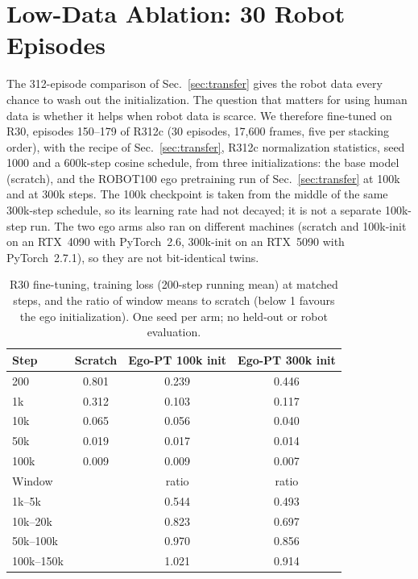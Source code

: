\documentclass[conference,10pt]{IEEEtran}
\begin{document}
\section{Low-Data Ablation: 30 Robot Episodes}\label{sec:r30}
The 312-episode comparison of Sec.~\ref{sec:transfer} gives the robot data every chance to wash out the initialization. The
question that matters for using human data is whether it helps when robot data is scarce. We therefore fine-tuned on R30,
episodes 150--179 of R312c (30 episodes, 17{,}600 frames, five per stacking order), with the recipe of
Sec.~\ref{sec:transfer}, R312c normalization statistics, seed 1000 and a 600k-step cosine schedule, from three
initializations: the base model (scratch), and the ROBOT100 ego pretraining run of Sec.~\ref{sec:transfer} at 100k and at
300k steps. The 100k checkpoint is taken from the middle of the same 300k-step schedule, so its learning rate had not decayed;
it is not a separate 100k-step run. The two ego arms also ran on different machines (scratch and 100k-init on an RTX~4090
with PyTorch~2.6, 300k-init on an RTX~5090 with PyTorch~2.7.1), so they are not bit-identical twins.

\begin{table}[t]
\centering\footnotesize\setlength{\tabcolsep}{4pt}
\caption{R30 fine-tuning, training loss (200-step running mean) at matched steps, and the ratio of window means to scratch
(below 1 favours the ego initialization). One seed per arm; no held-out or robot evaluation.}
\label{tab:r30}
\begin{tabular}{@{}lccc@{}}
\toprule
Step & Scratch & Ego-PT 100k init & Ego-PT 300k init \\
\midrule
200 & 0.801 & 0.239 & 0.446 \\
1k & 0.312 & 0.103 & 0.117 \\
10k & 0.065 & 0.056 & 0.040 \\
50k & 0.019 & 0.017 & 0.014 \\
100k & 0.009 & 0.009 & 0.007 \\
\midrule
Window & & ratio & ratio \\
\midrule
1k--5k & & 0.544 & 0.493 \\
10k--20k & & 0.823 & 0.697 \\
50k--100k & & 0.970 & 0.856 \\
100k--150k & & 1.021 & 0.914 \\
\bottomrule
\end{tabular}
\end{table}
\end{document}
